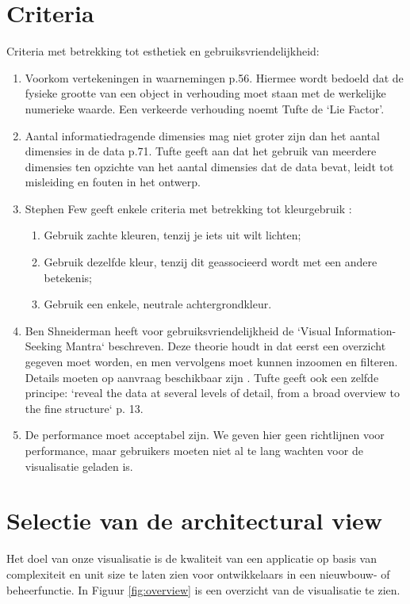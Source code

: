 \documentclass[a4paper]{article}
\begin{document}
\section{Criteria} \label{Criteria}
Criteria met betrekking tot esthetiek en gebruiksvriendelijkheid:
\begin{enumerate}
\item Voorkom vertekeningen in waarnemingen \cite{tufte2014visual} p.56. Hiermee wordt bedoeld dat de fysieke grootte van een object in verhouding moet staan met de werkelijke numerieke waarde. Een verkeerde verhouding noemt Tufte de `Lie Factor'.
\item Aantal informatiedragende dimensies mag niet groter zijn dan het aantal dimensies in de data \cite{tufte2014visual} p.71. Tufte geeft aan dat het gebruik van meerdere dimensies ten opzichte van het aantal dimensies dat de data bevat, leidt tot misleiding en fouten in het ontwerp.

\item Stephen Few geeft enkele criteria met betrekking tot kleurgebruik \cite{B}:
\begin{enumerate}[nosep]
\item Gebruik zachte kleuren, tenzij je iets uit wilt lichten;
\item Gebruik dezelfde kleur, tenzij dit geassocieerd wordt met een andere betekenis; 
\item Gebruik een enkele, neutrale achtergrondkleur.
\end{enumerate}

\item Ben Shneiderman heeft voor gebruiksvriendelijkheid de `Visual Information-Seeking Mantra` beschreven. Deze theorie houdt in dat eerst een overzicht gegeven moet worden, en men vervolgens moet kunnen inzoomen en filteren. Details moeten op aanvraag beschikbaar zijn \cite{A}. Tufte geeft ook een zelfde principe: `reveal the data at several levels of detail, from a broad overview to the fine structure` \cite{tufte2014visual} p. 13.

\item De performance moet acceptabel zijn. We geven hier geen richtlijnen voor performance, maar gebruikers moeten niet al te lang wachten voor de visualisatie geladen is.
\end{enumerate}


\section{Selectie van de architectural view}
Het doel van onze visualisatie is de kwaliteit van een applicatie op basis van complexiteit en unit size te laten zien voor ontwikkelaars in een nieuwbouw- of beheerfunctie. In Figuur \ref{fig:overview} is een overzicht van de visualisatie te zien.
\end{document}
